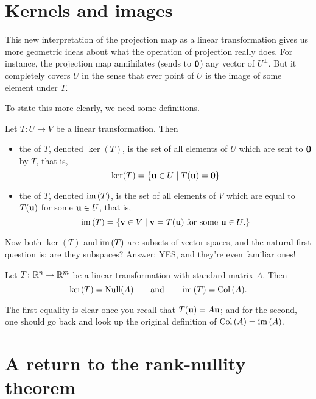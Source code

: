 \section{Kernels and images}

This new interpretation of the projection map as a linear transformation
gives us more geometric ideas about what the operation of projection
really does.  For instance, the projection map annihilates (sends to
$\mathbf{0}$) any vector of $U^\perp$.  But it completely covers $U$
in the sense that ever point of $U$ is the image of some element under
$T$.

To state this more clearly, we need some definitions.

\begin{definition}
Let $T \colon U \to V$ be a linear transformation.  Then
\begin{itemize}
\item the  of $T$, denoted $\ker(T)$, is the
set of all elements of $U$ which are sent to $\mathbf{0}$ by $T$,
that is,
$$
\ker(T) = \{ \mathbf{u} \in U \mid T(\mathbf{u}) = \mathbf{0}\}
$$
\item the  of $T$, denoted $\operatorname{im}\,(T)$, is the set of all
elements of $V$ which are equal to $T(\mathbf{u})$ for some $\mathbf{u} \in U$,
that is,
$$
\operatorname{im}\,(T) = \{ \mathbf{v} \in V \mid \mathbf{v} = T(\mathbf{u}) \; \textrm{for some $\mathbf{u}\in U$.}\}
$$
\end{itemize}
\end{definition}

Now both $\ker(T)$ and $\operatorname{im}\,(T)$ are subsets of vector spaces, and
the natural first question is: are they subspaces?  Answer:  YES,
and they're even familiar ones!

\begin{theorem}
Let $T \colon \mathbb{R}^n \to \mathbb{R}^m$ be a linear transformation with
standard matrix $A$.  Then
$$
\ker(T) = \operatorname{Null}(A) \qquad \textrm{and} \qquad \operatorname{im}\,(T) = \operatorname{Col\,}(A).
$$
\end{theorem}

The first equality is clear once you recall that $T(\mathbf{u}) = A\mathbf{u}$;
and for the second, one should go back and look up the original
definition of $\operatorname{Col\,}(A) = \operatorname{im}\,(A)$.

\section{A return to the rank-nullity theorem}


